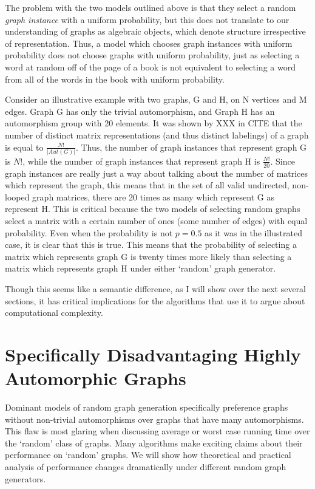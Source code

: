 \documentclass[11pt,a4paper]{report}
\begin{document}
The problem with the two models outlined above is that they select a random \emph{graph instance} with a uniform probability, but this does not translate to our understanding of graphs as algebraic objects, which denote structure irrespective of representation.
Thus, a model which chooses graph instances with uniform probability does not choose graphs with uniform probability, just as selecting a word at random off of the page of a book is not equivalent to selecting a word from all of the words in the book with uniform probability.

Consider an illustrative example with two graphs, G and H, on N vertices and M edges.
Graph G has only the trivial automorphism, and Graph H has an automorphism group with 20 elements.
It was shown by XXX in CITE that the number of distinct matrix representations (and thus distinct labelings) of a graph is equal to $\frac{N!}{|Aut(G)|}$.
Thus, the number of graph instances that represent graph G is $N!$, while the number of graph instances that represent graph H is $\frac{N!}{20}$.
Since graph instances are really just a way about talking about the number of matrices which represent the graph, this means that in the set of all valid undirected, non-looped graph matrices, there are 20 times as many which represent G as represent H.
This is critical because the two models of selecting random graphs select a matrix with a certain number of ones (some number of edges) with equal probability.
Even when the probability is not $p=0.5$ as it was in the illustrated case, it is clear that this is true.
This means that the probability of selecting a matrix which represents graph G is twenty times more likely than selecting a matrix which represents graph H under either `random' graph generator.

Though this seems like a semantic difference, as I will show over the next several sections, it has critical implications for the algorithms that use it to argue about computational complexity.

\section{Specifically Disadvantaging Highly Automorphic Graphs}

Dominant models of random graph generation specifically preference graphs without non-trivial automorphisms over graphs that have many automorphisms. 
This flaw is most glaring when discussing average or worst case running time over the `random' class of graphs.
Many algorithms make exciting claims about their performance on `random' graphs.
We will show how theoretical and practical analysis of performance changes dramatically under different random graph generators.
\end{document}
